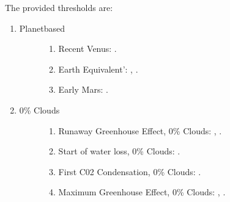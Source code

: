 \documentclass[letterpaper,10pt,english]{sphinxmanual}
\begin{document}
\sphinxAtStartPar
The provided thresholds are:
\begin{enumerate}
%
\item {} \begin{description}
\item[{Planet\sphinxhyphen{}based}] \leavevmode\begin{enumerate}
%
\item {} 
\sphinxAtStartPar
Recent Venus: .

\item {} 
\sphinxAtStartPar
Earth Equivalent’: , {\hyperref[\detokenize{quantities/insolation_models/earth_equivalent_limit:id1}]{}}.

\item {} 
\sphinxAtStartPar
Early Mars: .

\end{enumerate}

\end{description}

\item {} \begin{description}
\item[{0\% Clouds}] \leavevmode\begin{enumerate}
%
\item {} 
\sphinxAtStartPar
Runaway Greenhouse Effect, 0\% Clouds: , {\hyperref[\detokenize{quantities/insolation_models/conservative_minimum_limit:id1}]{}}.

\item {} 
\sphinxAtStartPar
Start of water loss, 0\% Clouds: .

\item {} 
\sphinxAtStartPar
First C02 Condensation, 0\% Clouds: .

\item {} 
\sphinxAtStartPar
Maximum Greenhouse Effect, 0\% Clouds: , {\hyperref[\detokenize{quantities/insolation_models/conservative_maximum_limit:id1}]{}}.

\end{enumerate}


\end{description}
\end{enumerate}
\end{document}

